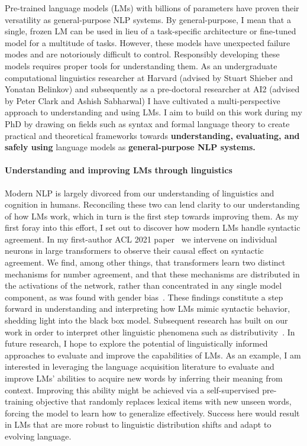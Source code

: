 \documentclass[11pt]{article}
\begin{document}
Pre-trained language models (LMs) with billions of parameters 
have proven their versatility 
as general-purpose NLP systems. 
By general-purpose, I mean that a single, frozen LM can be used 
in lieu of a task-specific architecture or fine-tuned model 
for a multitude of tasks.
However, these models have unexpected failure modes 
and are notoriously difficult to control.
Responsibly developing these models
requires proper tools for understanding them.
As an undergraduate computational linguistics researcher at Harvard 
(advised by Stuart Shieber and Yonatan Belinkov)
and subsequently as a pre-doctoral researcher at AI2 
(advised by Peter Clark and Ashish Sabharwal)
I have cultivated a multi-perspective approach to understanding and using LMs.
I aim to build on this work during my PhD
by drawing on fields such as syntax and formal language theory 
to create practical and theoretical frameworks  
towards \textbf{understanding, evaluating, and safely using} language models 
as \textbf{general-purpose NLP systems.}

\paragraph{Understanding and improving LMs through linguistics}

Modern NLP is largely divorced 
from our understanding of linguistics and cognition in humans.
Reconciling these two can lend clarity to our understanding of how LMs work, 
which in turn is the first step towards improving them.
As my first foray into this effort, I set out to 
discover how modern LMs handle syntactic agreement.
In my first-author ACL 2021 paper~\cite{finlayson-etal-2021-causal}
we intervene on individual neurons in large transformers 
to observe their causal effect on syntactic agreement.
We find, among other things, that transformers learn 
two distinct mechanisms for number agreement,
and that these mechanisms are distributed 
in the activations of the network, 
rather than concentrated in any single model component,
as was found with gender bias~\cite{Vig2020InvestigatingGB}.
These findings constitute a step forward 
in understanding and interpreting
how LMs mimic syntactic behavior,
shedding light into the black box model.
Subsequent research has built on our work 
in order to interpret other linguistic phenomena 
such as distributivity~\cite{Ban2022TestingPL}.
In future research, I hope to explore 
the potential of linguistically informed approaches
to evaluate and improve the capabilities of LMs. 
As an example, I am interested in leveraging 
the language acquisition literature
to evaluate and improve LMs' abilities 
to acquire new words by inferring their meaning from context.
Improving this ability might be achieved 
via a self-supervised pre-training objective 
that randomly replaces lexical items with new unseen words, 
forcing the model to learn how to generalize effectively.
Success here would result in LMs that are 
more robust to linguistic distribution shifts
and adapt to evolving language.
\end{document}
